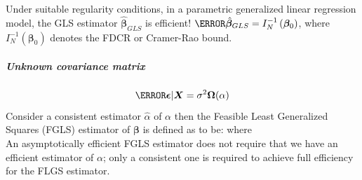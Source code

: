 Under suitable regularity conditions, in a parametric generalized linear regression model,
the GLS estimator $\hat{\bm{\beta}}_{GLS}$ is efficient! $\V{\hat{\bm{\beta}}_{GLS}}=I_{N}^{-1}
\left(\bm{\beta}_{0}\right)$, where $I_{N}^{-1}\left(\bm{\beta}_{0}\right)$ denotes the FDCR or 
Cramer-Rao bound.
\subparagraph{Unknown covariance matrix}
$$ \V{\bm{\epsilon}|\bm{X}}=\sigma^{2}\bm{\Omega}(\alpha)$$
Consider a consistent estimator $\hat{\alpha}$ of $\alpha$ then the Feasible Least Generalized
Squares (FGLS) estimator of $\bm{\beta}$ is defined as to be:
where \\
An asymptotically efficient FGLS estimator does not require that we have an efficient estimator
of $\alpha$; only a consistent one is required to achieve full efficiency for the FLGS estimator.

